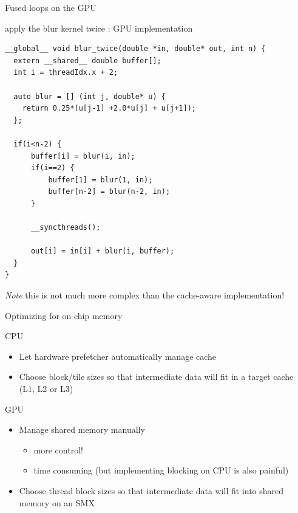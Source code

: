 \begin{frame}[fragile]{Fused loops on the GPU}
    \begin{code}{apply the blur kernel twice : GPU implementation}
        \begin{lstlisting}[style=boxcudatiny]
__global__ void blur_twice(double *in, double* out, int n) {
  extern __shared__ double buffer[];
  int i = threadIdx.x + 2;

  auto blur = [] (int j, double* u) {
    return 0.25*(u[j-1] +2.0*u[j] + u[j+1]);
  };

  if(i<n-2) {
      buffer[i] = blur(i, in);
      if(i==2) {
          buffer[1] = blur(1, in);
          buffer[n-2] = blur(n-2, in);
      }

      __syncthreads();

      out[i] = in[i] + blur(i, buffer);
  }
}
        \end{lstlisting}
    \end{code}
    \emph{Note} this is not much more complex than the cache-aware implementation!
\end{frame}

\begin{frame}[fragile]{Optimizing for on-chip memory}
    \begin{info}{CPU}
        \begin{itemize}
            \item Let hardware prefetcher automatically manage cache
            \item Choose block/tile sizes so that intermediate data will fit in a target cache (L1, L2 or L3)
        \end{itemize}
    \end{info}
    \begin{info}{GPU}
        \begin{itemize}
            \item Manage shared memory manually
            \begin{itemize}
                \item more control!
                \item time consuming (but implementing blocking on CPU is also painful)
            \end{itemize}
            \item Choose thread block sizes so that intermediate data will fit into shared memory on an SMX
        \end{itemize}
    \end{info}

\end{frame}

